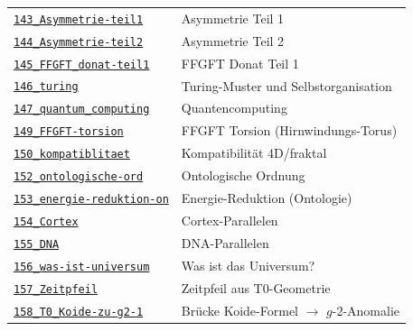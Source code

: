 {\begin{longtable}{@{}>{\raggedright\arraybackslash}p{} >{\raggedright\arraybackslash}p{}@{}}
\href{https://github.com/jpascher/T0-Time-Mass-Duality/blob/main/2/pdf/143_Asymmetrie-teil1_De.pdf}{\texttt{143\_Asymmetrie-teil1}} & Asymmetrie Teil 1 \\
\href{https://github.com/jpascher/T0-Time-Mass-Duality/blob/main/2/pdf/144_Asymmetrie-teil2_De.pdf}{\texttt{144\_Asymmetrie-teil2}} & Asymmetrie Teil 2 \\
\href{https://github.com/jpascher/T0-Time-Mass-Duality/blob/main/2/pdf/145_FFGFT_donat-teil1_De.pdf}{\texttt{145\_FFGFT\_donat-teil1}} & FFGFT Donat Teil 1 \\
\href{https://github.com/jpascher/T0-Time-Mass-Duality/blob/main/2/pdf/146_turing_De.pdf}{\texttt{146\_turing}} & Turing-Muster und Selbstorganisation \\
\href{https://github.com/jpascher/T0-Time-Mass-Duality/blob/main/2/pdf/147_quantum_computing_De.pdf}{\texttt{147\_quantum\_computing}} & Quantencomputing \\
\href{https://github.com/jpascher/T0-Time-Mass-Duality/blob/main/2/pdf/149_FFGFT-torsion_De.pdf}{\texttt{149\_FFGFT-torsion}} & FFGFT Torsion (Hirnwindungs-Torus) \\
\href{https://github.com/jpascher/T0-Time-Mass-Duality/blob/main/2/pdf/150_kompatiblitaet_De.pdf}{\texttt{150\_kompatiblitaet}} & Kompatibilität 4D/fraktal \\
\href{https://github.com/jpascher/T0-Time-Mass-Duality/blob/main/2/pdf/152_ontologische-ord_De.pdf}{\texttt{152\_ontologische-ord}} & Ontologische Ordnung \\
\href{https://github.com/jpascher/T0-Time-Mass-Duality/blob/main/2/pdf/153_energie-reduktion-on_De.pdf}{\texttt{153\_energie-reduktion-on}} & Energie-Reduktion (Ontologie) \\
\href{https://github.com/jpascher/T0-Time-Mass-Duality/blob/main/2/pdf/154_Cortex_De.pdf}{\texttt{154\_Cortex}} & Cortex-Parallelen \\
\href{https://github.com/jpascher/T0-Time-Mass-Duality/blob/main/2/pdf/155_DNA_De.pdf}{\texttt{155\_DNA}} & DNA-Parallelen \\
\href{https://github.com/jpascher/T0-Time-Mass-Duality/blob/main/2/pdf/156_was-ist-universum_De.pdf}{\texttt{156\_was-ist-universum}} & Was ist das Universum? \\
\href{https://github.com/jpascher/T0-Time-Mass-Duality/blob/main/2/pdf/157_Zeitpfeil_De.pdf}{\texttt{157\_Zeitpfeil}} & Zeitpfeil aus T0-Geometrie \\
\href{https://github.com/jpascher/T0-Time-Mass-Duality/blob/main/2/pdf/158_T0_Koide-zu-g2-1_De.pdf}{\texttt{158\_T0\_Koide-zu-g2-1}} & Brücke Koide-Formel $\to$ $g$-$2$-Anomalie \\

\end{longtable}}
